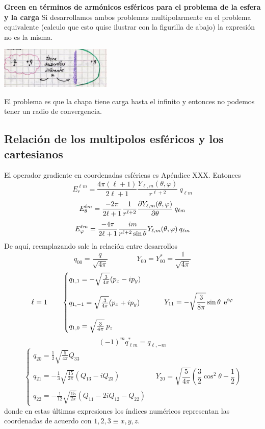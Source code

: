 \documentclass[10pt,oneside]{CBFT_book}
\begin{document}
\begin{ejemplo}{\bf Green en términos de armónicos esféricos para el problema de la esfera y
la carga}
Si desarrollamos ambos problemas multipolarmente en el problema equivalente (calculo que esto quise
ilustrar con la figurilla de abajo) la expresión no es la misma.

\includegraphics[width=0.4\textwidth]{images/fig_ft1_green_ArmEsf_chapaV0_2.jpg} 

El problema es que la chapa tiene carga hasta el infinito y entonces no podemos tener un radio
de convergencia.
 
\end{ejemplo}


\subsection{Relación de los multipolos esféricos y los cartesianos}

El operador gradiente en coordenadas esféricas es Apéndice XXX.
Entonces
\[
	E_r^{\ell m} = \frac{4\pi(\ell+1)}{ 2\ell+1 } 
	\frac{Y_{\ell,m}(\theta,\varphi) }{r^{\ell+2}} \: q_{\ell m}
\]
\[
	E_\theta^{\ell m} = \frac{-2\pi}{2\ell+1} \frac{1}{r^{\ell+2}}
	\frac{\partial^{\hspace{-0.05em}} {Y_{\ell,m}(\theta,\varphi) }}{\partial {\theta}^{\hspace{-0.05em}}} \: q_{\ell m}
\]
\[
	E_\varphi^{\ell m} = \frac{-4\pi}{2\ell+1} \frac{ i m}{r^{\ell+2}\sin\theta} 
	Y_{\ell,m}(\theta,\varphi) \: q_{\ell m}
\]
De aquí, reemplazando sale la relación entre desarrollos
\[
	q_{00} = \frac{q}{\sqrt{4\pi}} \qquad \qquad Y_{00} = Y_{00}^* = \frac{1}{\sqrt{4\pi}}
\]
\[
	\ell = 1 \qquad 
	\begin{cases}
	q_{1,1} = - \sqrt{\frac{3}{4\pi}}( p_x -i p_y ) \\
	\\
	 q_{1,-1} = \sqrt{\frac{3}{4\pi}}( p_x + i p_y ) \\
	 \\
	 q_{1,0} = \sqrt{\frac{3}{4\pi}} \: p_z
	\end{cases}
	\qquad 
	Y_{11} = -\sqrt{\frac{3}{8\pi}}  \sin\theta \: \:\mathrm{e}^{i\varphi}
\]
\[
	(-1)^m q_{\ell m}^* = q_{\ell,-m}
\]
\[
	\begin{cases}
	q_{20} = \frac{1}{2} \sqrt{\frac{5}{4\pi}} Q_{33} \\
	\\
	 q_{21} = - \frac{1}{3} \sqrt{\frac{15}{2\pi}}( Q_{13} -i Q_{23} ) \\
	 \\
	 q_{22} = - \frac{1}{12} \sqrt{\frac{15}{2\pi}}( Q_{11} - 2 i Q_{12} - Q_{22} )	 
	\end{cases}
	\quad 
	Y_{20} = \sqrt{\frac{5}{4\pi}}\left(  \frac{3}{2} \cos^2\theta - \frac{1}{2} \right)	
\]
donde en estas últimas expresiones los índices numéricos representan las
coordenadas de acuerdo con $1,2,3 \equiv x,y,z$.
\end{document}
